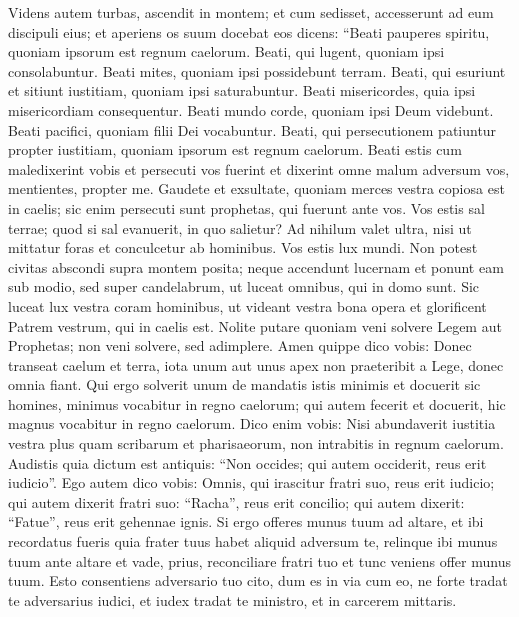 \begin{biblechapter}  
\verse Videns autem turbas, ascendit in montem; et cum sedisset, accesserunt ad eum discipuli eius; 
\verse et aperiens os suum docebat eos dicens: 
\verse “Beati pauperes spiritu, quoniam ipsorum est regnum caelorum. 
\verse Beati, qui lugent, quoniam ipsi consolabuntur. 
\verse Beati mites, quoniam ipsi possidebunt terram. 
\verse Beati, qui esuriunt et sitiunt iustitiam, quoniam ipsi saturabuntur. 
\verse Beati misericordes, quia ipsi misericordiam consequentur. 
\verse Beati mundo corde, quoniam ipsi Deum videbunt. 
\verse Beati pacifici, quoniam filii Dei vocabuntur. 
\verse Beati, qui persecutionem patiuntur propter iustitiam, quoniam ipsorum est regnum caelorum. 
\verse Beati estis cum maledixerint vobis et persecuti vos fuerint et dixerint omne malum adversum vos, mentientes, propter me. 
\verse Gaudete et exsultate, quoniam merces vestra copiosa est in caelis; sic enim persecuti sunt prophetas, qui fuerunt ante vos. 
\verse Vos estis sal terrae; quod si sal evanuerit, in quo salietur? Ad nihilum valet ultra, nisi ut mittatur foras et conculcetur ab hominibus. 
\verse Vos estis lux mundi. Non potest civitas abscondi supra montem posita; 
\verse neque accendunt lucernam et ponunt eam sub modio, sed super candelabrum, ut luceat omnibus, qui in domo sunt. 
\verse Sic luceat lux vestra coram hominibus, ut videant vestra bona opera et glorificent Patrem vestrum, qui in caelis est. 
\verse Nolite putare quoniam veni solvere Legem aut Prophetas; non veni solvere, sed adimplere. 
\verse Amen quippe dico vobis: Donec transeat caelum et terra, iota unum aut unus apex non praeteribit a Lege, donec omnia fiant. 
\verse Qui ergo solverit unum de mandatis istis minimis et docuerit sic homines, minimus vocabitur in regno caelorum; qui autem fecerit et docuerit, hic magnus vocabitur in regno caelorum. 
\verse Dico enim vobis: Nisi abundaverit iustitia vestra plus quam scribarum et pharisaeorum, non intrabitis in regnum caelorum. 
\verse Audistis quia dictum est antiquis: “Non occides; qui autem occiderit, reus erit iudicio”. 
\verse Ego autem dico vobis: Omnis, qui irascitur fratri suo, reus erit iudicio; qui autem dixerit fratri suo: “Racha”, reus erit concilio; qui autem dixerit: “Fatue”, reus erit gehennae ignis. 
\verse Si ergo offeres munus tuum ad altare, et ibi recordatus fueris quia frater tuus habet aliquid adversum te, 
\verse relinque ibi munus tuum ante altare et vade, prius, reconciliare fratri tuo et tunc veniens offer munus tuum. 
\verse Esto consentiens adversario tuo cito, dum es in via cum eo, ne forte tradat te adversarius iudici, et iudex tradat te ministro, et in carcerem mittaris. 

\end{biblechapter}
